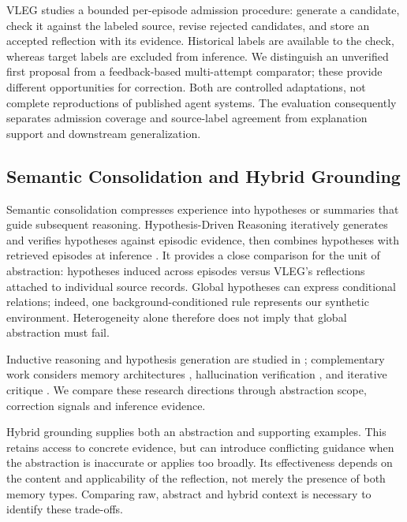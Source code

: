 \documentclass[journal]{IEEEtran}
\theoremstyle{definition}
\theoremstyle{remark}
\begin{document}
VLEG studies a bounded per-episode admission procedure: generate a candidate, check it against the labeled source, revise rejected candidates, and store an accepted reflection with its evidence. Historical labels are available to the check, whereas target labels are excluded from inference. We distinguish an unverified first proposal from a feedback-based multi-attempt comparator; these provide different opportunities for correction. Both are controlled adaptations, not complete reproductions of published agent systems. The evaluation consequently separates admission coverage and source-label agreement from explanation support and downstream generalization.

\subsection{Semantic Consolidation and Hybrid Grounding}
Semantic consolidation compresses experience into hypotheses or summaries that guide subsequent reasoning. Hypothesis-Driven Reasoning iteratively generates and verifies hypotheses against episodic evidence, then combines hypotheses with retrieved episodes at inference \cite{agarwal2026hypothesis}. It provides a close comparison for the unit of abstraction: hypotheses induced across episodes versus VLEG's reflections attached to individual source records. Global hypotheses can express conditional relations; indeed, one background-conditioned rule represents our synthetic environment. Heterogeneity alone therefore does not imply that global abstraction must fail.

Inductive reasoning and hypothesis generation are studied in \cite{he2024idea,kim2022playgrounds,lee2024generating,qiu2024phenomenal,zhou2024hypothesis}; complementary work considers memory architectures \cite{kim2023machine,li2024memory,wang2025mirix}, hallucination verification \cite{manakul2023selfcheckgpt,dhuliawala2024chain}, and iterative critique \cite{madaan2023selfrefine,gou2024critic}. We compare these research directions through abstraction scope, correction signals and inference evidence.

Hybrid grounding supplies both an abstraction and supporting examples. This retains access to concrete evidence, but can introduce conflicting guidance when the abstraction is inaccurate or applies too broadly. Its effectiveness depends on the content and applicability of the reflection, not merely the presence of both memory types. Comparing raw, abstract and hybrid context is necessary to identify these trade-offs.
\end{document}
